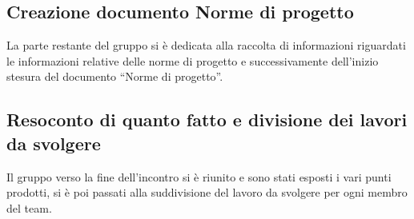 \subsection{Creazione documento Norme di progetto}
La parte restante del gruppo si è dedicata alla raccolta di informazioni riguardati le informazioni relative delle norme di progetto e successivamente dell’inizio stesura del documento “Norme di progetto”.\\

\subsection{Resoconto di quanto fatto e divisione dei lavori da svolgere}
Il gruppo verso la fine dell'incontro si è riunito e sono stati esposti i vari punti prodotti, si è poi passati alla suddivisione del lavoro da svolgere per ogni membro del team.
\clearpage